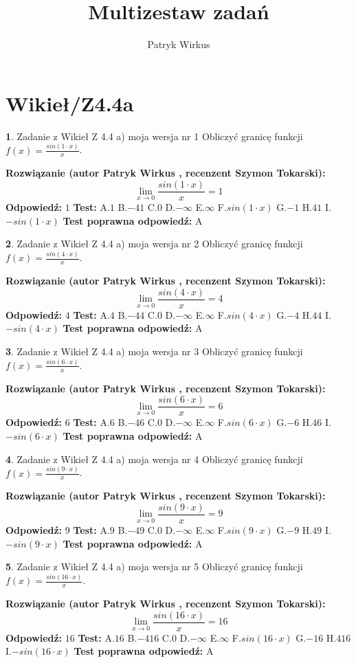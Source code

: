 \documentclass[12pt, a4paper]{article}
\title{Multizestaw zadań}
\author{Patryk Wirkus}
\date{}
\theoremstyle{definition} %
\newtheorem{zad}{}
\newcommand{\kategoria}[1]{\section{#1}}
\newcommand{\zadStart}[1]{\begin{zad}#1\newline}
\newcommand{\zadStop}{\end{zad}}
\newcommand{\rozwStart}[2]{\noindent \textbf{Rozwiązanie (autor #1 , recenzent #2): }\newline}
\newcommand{\rozwStop}{\newline}
\newcommand{\odpStart}{\noindent \textbf{Odpowiedź:}\newline}
\newcommand{\odpStop}{\newline}
\newcommand{\testStart}{\noindent \textbf{Test:}\newline}
\newcommand{\testStop}{\newline}
\newcommand{\kluczStart}{\noindent \textbf{Test poprawna odpowiedź:}\newline}
\newcommand{\kluczStop}{\newline}
\begin{document}
\maketitle

\kategoria{Wikieł/Z4.4a}


\zadStart{Zadanie z Wikieł Z 4.4 a) moja wersja nr 1}
Obliczyć granicę funkcji $f(x)=\frac{sin(1\cdot x)}{x}$.
\zadStop
\rozwStart{Patryk Wirkus}{Szymon Tokarski}
$$\lim\limits_{x\to 0}\frac{sin(1\cdot x)}{x}=
1$$
\rozwStop
\odpStart
$1$
\odpStop
\testStart
A.$1$
B.$-41$
C.$0$
D.$-\infty$
E.$\infty$
F.$sin(1\cdot x)$
G.$-1$
H.$41$
I.$-sin(1\cdot x)$
\testStop
\kluczStart
A
\kluczStop



\zadStart{Zadanie z Wikieł Z 4.4 a) moja wersja nr 2}
Obliczyć granicę funkcji $f(x)=\frac{sin(4\cdot x)}{x}$.
\zadStop
\rozwStart{Patryk Wirkus}{Szymon Tokarski}
$$\lim\limits_{x\to 0}\frac{sin(4\cdot x)}{x}=
4$$
\rozwStop
\odpStart
$4$
\odpStop
\testStart
A.$4$
B.$-44$
C.$0$
D.$-\infty$
E.$\infty$
F.$sin(4\cdot x)$
G.$-4$
H.$44$
I.$-sin(4\cdot x)$
\testStop
\kluczStart
A
\kluczStop



\zadStart{Zadanie z Wikieł Z 4.4 a) moja wersja nr 3}
Obliczyć granicę funkcji $f(x)=\frac{sin(6\cdot x)}{x}$.
\zadStop
\rozwStart{Patryk Wirkus}{Szymon Tokarski}
$$\lim\limits_{x\to 0}\frac{sin(6\cdot x)}{x}=
6$$
\rozwStop
\odpStart
$6$
\odpStop
\testStart
A.$6$
B.$-46$
C.$0$
D.$-\infty$
E.$\infty$
F.$sin(6\cdot x)$
G.$-6$
H.$46$
I.$-sin(6\cdot x)$
\testStop
\kluczStart
A
\kluczStop



\zadStart{Zadanie z Wikieł Z 4.4 a) moja wersja nr 4}
Obliczyć granicę funkcji $f(x)=\frac{sin(9\cdot x)}{x}$.
\zadStop
\rozwStart{Patryk Wirkus}{Szymon Tokarski}
$$\lim\limits_{x\to 0}\frac{sin(9\cdot x)}{x}=
9$$
\rozwStop
\odpStart
$9$
\odpStop
\testStart
A.$9$
B.$-49$
C.$0$
D.$-\infty$
E.$\infty$
F.$sin(9\cdot x)$
G.$-9$
H.$49$
I.$-sin(9\cdot x)$
\testStop
\kluczStart
A
\kluczStop



\zadStart{Zadanie z Wikieł Z 4.4 a) moja wersja nr 5}
Obliczyć granicę funkcji $f(x)=\frac{sin(16\cdot x)}{x}$.
\zadStop
\rozwStart{Patryk Wirkus}{Szymon Tokarski}
$$\lim\limits_{x\to 0}\frac{sin(16\cdot x)}{x}=
16$$
\rozwStop
\odpStart
$16$
\odpStop
\testStart
A.$16$
B.$-416$
C.$0$
D.$-\infty$
E.$\infty$
F.$sin(16\cdot x)$
G.$-16$
H.$416$
I.$-sin(16\cdot x)$
\testStop
\kluczStart
A
\kluczStop
\end{document}
